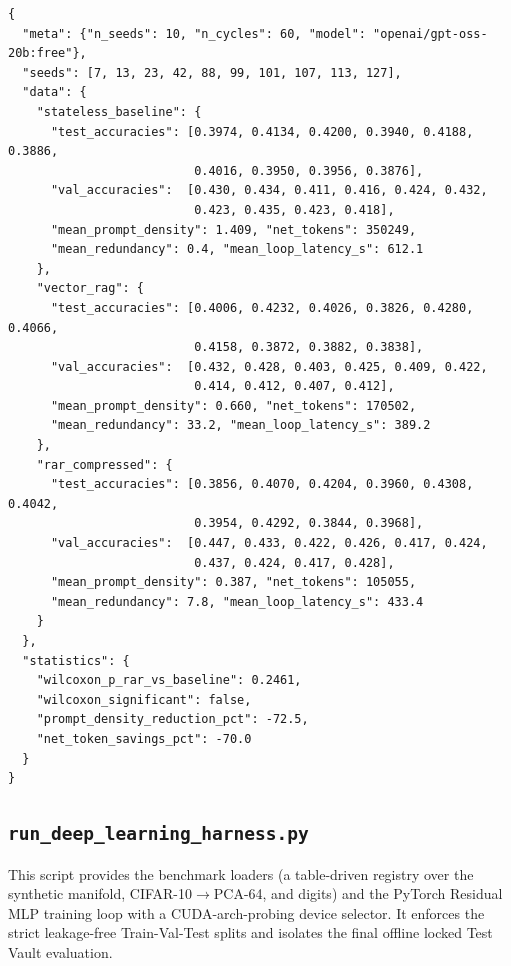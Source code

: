 \documentclass[conference]{IEEEtran}
\begin{document}
\begin{lstlisting}[language={},basicstyle=\ttfamily\tiny,
    caption={Raw pilot\_results.json output},label=lst:pilot_json]
{
  "meta": {"n_seeds": 10, "n_cycles": 60, "model": "openai/gpt-oss-20b:free"},
  "seeds": [7, 13, 23, 42, 88, 99, 101, 107, 113, 127],
  "data": {
    "stateless_baseline": {
      "test_accuracies": [0.3974, 0.4134, 0.4200, 0.3940, 0.4188, 0.3886,
                          0.4016, 0.3950, 0.3956, 0.3876],
      "val_accuracies":  [0.430, 0.434, 0.411, 0.416, 0.424, 0.432,
                          0.423, 0.435, 0.423, 0.418],
      "mean_prompt_density": 1.409, "net_tokens": 350249,
      "mean_redundancy": 0.4, "mean_loop_latency_s": 612.1
    },
    "vector_rag": {
      "test_accuracies": [0.4006, 0.4232, 0.4026, 0.3826, 0.4280, 0.4066,
                          0.4158, 0.3872, 0.3882, 0.3838],
      "val_accuracies":  [0.432, 0.428, 0.403, 0.425, 0.409, 0.422,
                          0.414, 0.412, 0.407, 0.412],
      "mean_prompt_density": 0.660, "net_tokens": 170502,
      "mean_redundancy": 33.2, "mean_loop_latency_s": 389.2
    },
    "rar_compressed": {
      "test_accuracies": [0.3856, 0.4070, 0.4204, 0.3960, 0.4308, 0.4042,
                          0.3954, 0.4292, 0.3844, 0.3968],
      "val_accuracies":  [0.447, 0.433, 0.422, 0.426, 0.417, 0.424,
                          0.437, 0.424, 0.417, 0.428],
      "mean_prompt_density": 0.387, "net_tokens": 105055,
      "mean_redundancy": 7.8, "mean_loop_latency_s": 433.4
    }
  },
  "statistics": {
    "wilcoxon_p_rar_vs_baseline": 0.2461,
    "wilcoxon_significant": false,
    "prompt_density_reduction_pct": -72.5,
    "net_token_savings_pct": -70.0
  }
}
\end{lstlisting}

\subsection{\texttt{run\_deep\_learning\_harness.py}}
This script provides the benchmark loaders (a table-driven registry over the synthetic manifold, CIFAR-10$\to$PCA-64, and digits) and the PyTorch Residual MLP training loop with a CUDA-arch-probing device selector. It enforces the strict leakage-free Train-Val-Test splits and isolates the final offline locked Test Vault evaluation.
\end{document}

